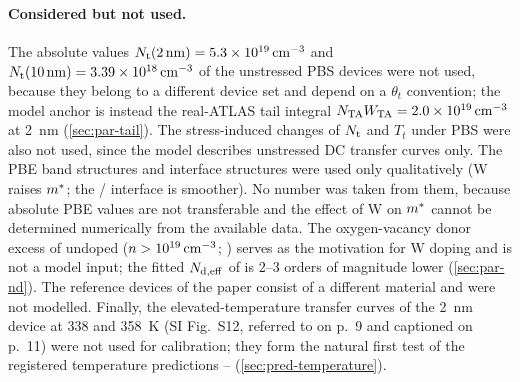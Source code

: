 \paragraph{Considered but not used.}
The absolute values $N_{\mathrm{t}}(\SI{2}{nm}) = \SI{5.3e19}{cm^{-3}}$ and
$N_{\mathrm{t}}(\SI{10}{nm}) = \SI{3.39e18}{cm^{-3}}$ of the unstressed PBS devices \citep[p.~9]{Januar2026}
were not used, because they belong to a different device set and depend on a $\theta_t$ convention;
the model anchor is instead the real-ATLAS tail integral $N_{\mathrm{TA}}W_{\mathrm{TA}} = \SI{2.0e19}{cm^{-3}}$ at
\SI{2}{nm} (\cref{sec:par-tail}). The stress-induced changes of $N_{\mathrm{t}}$ and $T_t$ under PBS
\citep[p.~9]{Januar2026} were also not used, since the model describes unstressed DC transfer curves
only. The PBE band structures and interface structures \citep[pp.~3, 5]{Januar2026} were used only
qualitatively (W raises $m^{*}$; the \IWO/\HfO{} interface is smoother). No number was taken from
them, because absolute PBE values are not transferable and the effect of W on $m^{*}$ cannot be
determined numerically from the available data. The oxygen-vacancy donor excess of undoped \InO{}
($n > 10^{19}\,\mathrm{cm}^{-3}$; \citealp[p.~2]{Januar2026}) serves as the motivation for W doping and is not a
model input; the fitted $N_{\mathrm{d,eff}}$ of \IWO{} is 2--3 orders of magnitude lower (\cref{sec:par-nd}).
The \InO{} reference devices of the paper consist of a different material and were not modelled.
Finally, the elevated-temperature transfer curves of the \SI{2}{nm} device at 338 and \SI{358}{K}
(SI Fig.~S12, referred to on p.~9 and captioned on p.~11) were not used for calibration; they form
the natural first test of the registered temperature predictions --
(\cref{sec:pred-temperature}).


